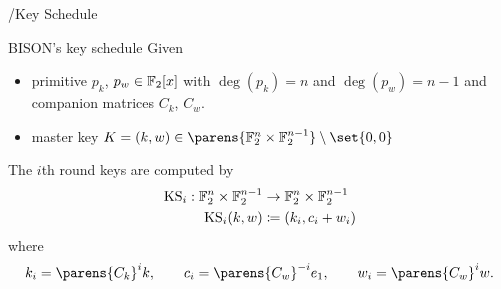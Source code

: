 \begin{frame}{\bison/}{Key Schedule}
    \begin{block}{BISON's key schedule}
        \vspace{0.5\baselineskip}
        Given
        \begin{itemize}
            \item primitive $p_k$, $p_w \in \mathbb{F}_2[x]$ with $\deg(p_k) = n$ and $\deg(p_w) = n-1$ and companion matrices $C_k$, $C_w$.
            \item master key $K = (k, w) \in \parens{\F_2^n \times \F_2^{n-1}} \setminus \set{0,0}$
        \end{itemize}
        The $i$th round keys are computed by
        \begin{align*}
            \mathrm{KS}_i : \mathbb{F}_2^n \times \mathbb{F}_2^{n-1} &\to \mathbb{F}_2^n \times \mathbb{F}_2^{n-1} \\
            \mathrm{KS}_i(k, w) &\coloneqq (k_i, c_i + w_i)
        \end{align*}
        where \begin{equation*}
                k_i = \parens{C_k}^i k, \qquad
                c_i = \parens{C_w}^{-i} e_1, \qquad
                w_i = \parens{C_w}^i w.
            \end{equation*}
        \vspace{0.5\baselineskip}
    \end{block}
\end{frame}

